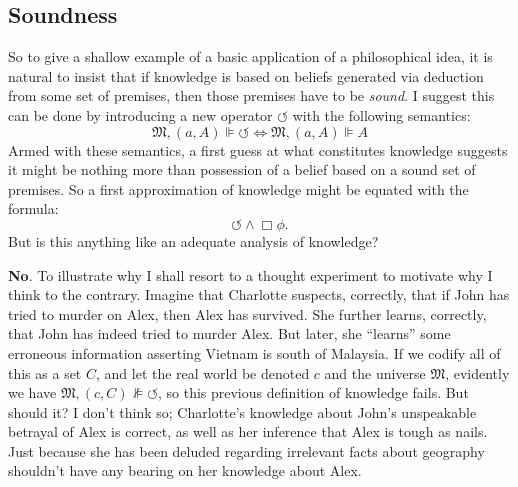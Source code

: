 \documentclass[11pt]{article}
\numberwithin{equation}{subsection}
\renewcommand{\Omega}{\mathfrak{M}}
\begin{document}
\subsection{Soundness}\label{soundness}
So to give a shallow example of a basic application of a philosophical
idea, it is natural to insist that if knowledge is based on beliefs
generated via deduction from some set of premises, then those premises
have to be \emph{sound}. I suggest this can be done by introducing a
new operator $\circlearrowleft$ with the following semantics:
\[ \Omega,(a,A)\VDash \circlearrowleft \iff \Omega,(a,A)\VDash A\]
Armed with these semantics, a first guess at what constitutes
knowledge suggests it might be nothing more than possession of a
belief based on a sound set of premises. So a first approximation of
knowledge might be equated with the formula:
$$\circlearrowleft \wedge \Box \phi.$$
But is this anything like an adequate analysis of knowledge?

\textbf{No}. To illustrate why I shall resort to a thought experiment to motivate why I think to the contrary.
Imagine that Charlotte suspects, correctly, that if John has tried to murder
on Alex, then Alex has survived.  She further learns, correctly, that John
has indeed tried to murder Alex.  But later, she ``learns'' some erroneous
information asserting Vietnam is south of Malaysia.  If we codify all of this as
a set $C$, and let the real world be
denoted $c$ and the universe $\Omega$, evidently we have $\Omega, (c, C) \nVDash
\circlearrowleft$, so this previous definition of knowledge fails.  But
should it?  I don't think so; Charlotte's knowledge about John's unspeakable
betrayal of Alex is correct, as well as her inference that Alex is tough as
nails.  Just because she has been deluded regarding irrelevant facts
about geography shouldn't have any bearing on her
knowledge about Alex.
\end{document}
